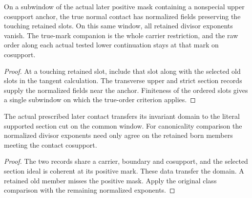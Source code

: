 \begin{theorem}
\label{hir:g1-later-selected-actual-true-order}
\leanok
On a subwindow of the actual later positive mask containing a
nonspecial upper cosupport anchor, the true normal contact has
normalized fields preserving the touching retained slots. On this
same window, all retained divisor exponents vanish. The true-mark
companion is the whole carrier restriction, and the raw order along
each actual tested lower continuation stays at that mark on cosupport.
\end{theorem}
\begin{proof}
At a touching retained slot, include that slot along with the
selected old slots in the tangent calculation. The transverse
upper and strict section records supply the normalized fields
near the anchor. Finiteness of the ordered slots gives a
single subwindow on which the true-order criterion applies.
\end{proof}

\begin{theorem}
\label{hir:g1-later-selected-section-canonical}
\leanok
The actual prescribed later contact transfers its invariant
domain to the literal supported section cut on the common window.
For canonicality comparison the normalized divisor exponents
need only agree on the retained born members meeting the
contact cosupport.
\end{theorem}
\begin{proof}
The two records share a carrier, boundary and cosupport, and the
selected section ideal is coherent at its positive mark. These
data transfer the domain. A retained old member misses the
positive mask. Apply the original class comparison with the
remaining normalized exponents.
\end{proof}

